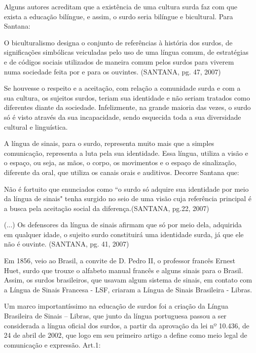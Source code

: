 \documentclass[brasil]{abnt}
\begin{document}
		Alguns autores acreditam que a existência de uma cultura surda faz com que exista a educação bilíngue, e assim, o surdo seria bilíngue e bicultural. Para Santana:
		
			\begin{citacao} O biculturalismo designa o conjunto de referências à história dos surdos, de significações simbólicas veiculadas pelo uso de uma língua comum, de estratégias e de códigos sociais
							utilizados de maneira comum pelos surdos para viverem numa sociedade feita por e para os ouvintes. (SANTANA, pg. 47, 2007)	
			\end{citacao}
			
		Se houvesse o respeito e a aceitação, com relação a comunidade surda e com a sua cultura, os sujeitos surdos, teriam sua identidade e não seriam tratados como diferentes diante da 
		sociedade. Infelizmente, na grande maioria das vezes, o surdo só é visto através da sua incapacidade, sendo esquecida toda a sua diversidade cultural e linguística. 
		
			A língua de sinais, para o surdo, representa muito mais que a simples comunicação, representa a luta pela sua identidade. Essa língua,  utiliza a visão e o espaço, ou seja, as mãos, o corpo, os 
			movimentos e o espaço de sinalização, diferente da oral, que utiliza os canais orais e auditivos. Decorre Santana que: 
			
			\begin{citacao}Não é fortuito que enunciados como “o surdo só adquire sua identidade por meio da língua de sinais" tenha surgido no seio de uma visão cuja referência 
							principal é a busca pela aceitação social da diferença.(SANTANA, pg.22, 2007)
							
							(...) Os defensores da língua de sinais afirmam que só por meio dela, adquirida em qualquer idade, o sujeito surdo constituirá uma identidade surda, já que ele
							não é ouvinte. (SANTANA, pg. 41, 2007)
			\end{citacao}
			
			Em 1856, veio ao Brasil, a convite de D. Pedro II, o professor francês Ernest Huet, surdo que trouxe o alfabeto manual francês e alguns sinais para o Brasil. Assim, os surdos brasileiros, que usavam algum
			sistema de sinais, em contato com a Língua de Sinais Francesa - LSF, criaram a Língua de Sinais Brasileira - Libras. 
			
			Um marco importantíssimo na educação de surdos foi a criação da Língua Brasileira de Sinais – Libras, que junto da língua portuguesa passou a ser considerada a língua oficial dos surdos, a partir da aprovação da 
			lei nº 10.436, de 24 de abril de 2002, que logo em seu primeiro artigo a define como meio legal de comunicação e expressão.	Art.1:
			
\end{document}
